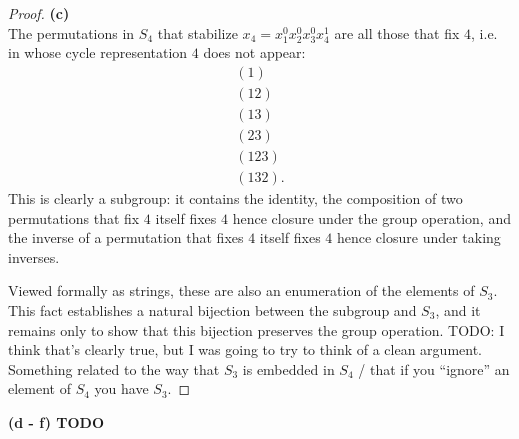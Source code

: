 \begin{proof}
  {\bf (c)}\\
  The permutations in $S_4$ that stabilize $x_4 = x_1^0x_2^0x_3^0x_4^1$ are all those that fix $4$, i.e. in whose cycle representation $4$ does not appear:
  \begin{align*}
    (1)\\
    (1 2)\\
    (1 3)\\
    (2 3)\\
    (1 2 3)\\
    (1 3 2).
  \end{align*}
  This is clearly a subgroup: it contains the identity, the composition of two permutations that
  fix $4$ itself fixes $4$ hence closure under the group operation, and the inverse of a
  permutation that fixes $4$ itself fixes $4$ hence closure under taking inverses.

  Viewed formally as strings, these are also an enumeration of the elements of $S_3$. This fact
  establishes a natural bijection between the subgroup and $S_3$, and it remains only to show that
  this bijection preserves the group operation. TODO: I think that's clearly true, but I was going
  to try to think of a clean argument. Something related to the way that $S_3$ is embedded in $S_4$
  / that if you ``ignore​'' an element of $S_4$ you have $S_3$.
\end{proof}

{\bf (d - f) TODO}\\
